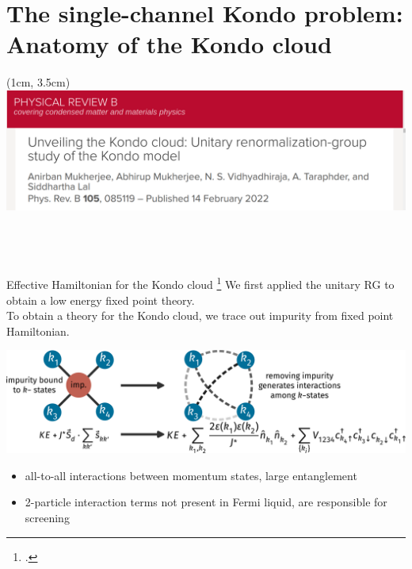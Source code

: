 \documentclass[aspectratio=169]{beamer}
\begin{document}
\section{The single-channel Kondo problem:\\ Anatomy of the Kondo cloud\vspace*{20pt}}
\begin{textblock*}{\textwidth}(1cm, 3.5cm)
\includegraphics[width=\textwidth]{kondocloud_prb.pdf}\\
\end{textblock*}
\subsection{~}

\begin{frame}{Effective Hamiltonian for the Kondo cloud}
\footcite{anirban_kondo,anirbanurg1,anirbanurg2}
We first applied the \alert{unitary RG} to obtain a low energy fixed point theory.\\[10pt]
To obtain a theory for the Kondo cloud, we \alert{trace out impurity} from fixed point Hamiltonian.
\vspace*{\fill}

\includegraphics[width=\textwidth]{KondoCloud.pdf}

\vspace*{\fill}
\begin{itemize}
	\item all-to-all interactions between momentum states, \alert{large entanglement}
	\item 2-particle interaction terms \alert{not} present in Fermi liquid, are \alert{responsible for screening}
\end{itemize}

\end{frame}
\end{document}
